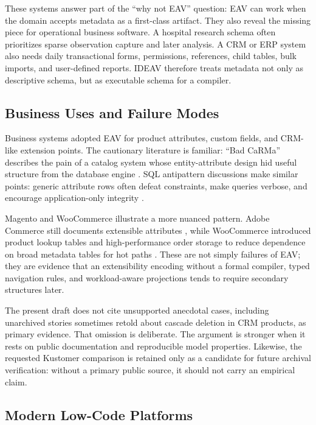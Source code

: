 \documentclass[11pt]{article}
\begin{document}
These systems answer part of the ``why not EAV'' question: EAV can work when the
domain accepts metadata as a first-class artifact. They also reveal the missing
piece for operational business software. A hospital research schema often
prioritizes sparse observation capture and later analysis. A CRM or ERP system
also needs daily transactional forms, permissions, references, child tables,
bulk imports, and user-defined reports. IDEAV therefore treats metadata not only
as descriptive schema, but as executable schema for a compiler.

\subsection{Business Uses and Failure Modes}

Business systems adopted EAV for product attributes, custom fields, and CRM-like
extension points. The cautionary literature is familiar: ``Bad CaRMa'' describes
the pain of a catalog system whose entity-attribute design hid useful structure
from the database engine \citep{gorman2006badcarma}. SQL antipattern discussions
make similar points: generic attribute rows often defeat constraints, make
queries verbose, and encourage application-only integrity \citep{karwin2010sql}.

Magento and WooCommerce illustrate a more nuanced pattern. Adobe Commerce still
documents extensible attributes \citep{adobeCommerceAttributes}, while
WooCommerce introduced product lookup tables and high-performance order storage
to reduce dependence on broad metadata tables for hot paths
\citep{woocommerceLookup,woocommerceHPOS}. These are not simply failures of EAV;
they are evidence that an extensibility encoding without a formal compiler,
typed navigation rules, and workload-aware projections tends to require
secondary structures later.

The present draft does not cite unsupported anecdotal cases, including
unarchived stories sometimes retold about cascade deletion in CRM products, as
primary evidence. That omission is deliberate. The argument is stronger when it
rests on public documentation and reproducible model properties.
Likewise, the requested Kustomer comparison is retained only as a candidate for
future archival verification: without a primary public source, it should not
carry an empirical claim.

\subsection{Modern Low-Code Platforms}
\end{document}
